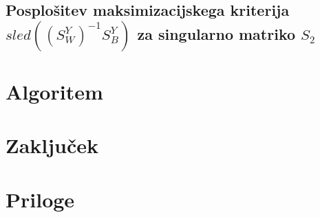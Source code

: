 \documentclass[mat1]{article}
\begin{document}
\subsection{Posplošitev maksimizacijskega kriterija $sled((S_W^Y)^{-1}S_B^Y)$ za singularno matriko $S_2$}

\section{Algoritem}

\section{Zaključek}

\section{Priloge}
\end{document}

